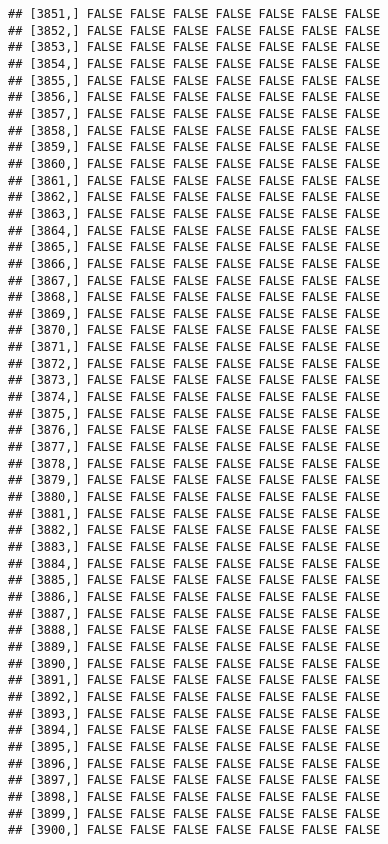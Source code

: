 \documentclass[
]{article}
\begin{document}
\begin{verbatim}
## [3851,] FALSE FALSE FALSE FALSE FALSE FALSE FALSE
## [3852,] FALSE FALSE FALSE FALSE FALSE FALSE FALSE
## [3853,] FALSE FALSE FALSE FALSE FALSE FALSE FALSE
## [3854,] FALSE FALSE FALSE FALSE FALSE FALSE FALSE
## [3855,] FALSE FALSE FALSE FALSE FALSE FALSE FALSE
## [3856,] FALSE FALSE FALSE FALSE FALSE FALSE FALSE
## [3857,] FALSE FALSE FALSE FALSE FALSE FALSE FALSE
## [3858,] FALSE FALSE FALSE FALSE FALSE FALSE FALSE
## [3859,] FALSE FALSE FALSE FALSE FALSE FALSE FALSE
## [3860,] FALSE FALSE FALSE FALSE FALSE FALSE FALSE
## [3861,] FALSE FALSE FALSE FALSE FALSE FALSE FALSE
## [3862,] FALSE FALSE FALSE FALSE FALSE FALSE FALSE
## [3863,] FALSE FALSE FALSE FALSE FALSE FALSE FALSE
## [3864,] FALSE FALSE FALSE FALSE FALSE FALSE FALSE
## [3865,] FALSE FALSE FALSE FALSE FALSE FALSE FALSE
## [3866,] FALSE FALSE FALSE FALSE FALSE FALSE FALSE
## [3867,] FALSE FALSE FALSE FALSE FALSE FALSE FALSE
## [3868,] FALSE FALSE FALSE FALSE FALSE FALSE FALSE
## [3869,] FALSE FALSE FALSE FALSE FALSE FALSE FALSE
## [3870,] FALSE FALSE FALSE FALSE FALSE FALSE FALSE
## [3871,] FALSE FALSE FALSE FALSE FALSE FALSE FALSE
## [3872,] FALSE FALSE FALSE FALSE FALSE FALSE FALSE
## [3873,] FALSE FALSE FALSE FALSE FALSE FALSE FALSE
## [3874,] FALSE FALSE FALSE FALSE FALSE FALSE FALSE
## [3875,] FALSE FALSE FALSE FALSE FALSE FALSE FALSE
## [3876,] FALSE FALSE FALSE FALSE FALSE FALSE FALSE
## [3877,] FALSE FALSE FALSE FALSE FALSE FALSE FALSE
## [3878,] FALSE FALSE FALSE FALSE FALSE FALSE FALSE
## [3879,] FALSE FALSE FALSE FALSE FALSE FALSE FALSE
## [3880,] FALSE FALSE FALSE FALSE FALSE FALSE FALSE
## [3881,] FALSE FALSE FALSE FALSE FALSE FALSE FALSE
## [3882,] FALSE FALSE FALSE FALSE FALSE FALSE FALSE
## [3883,] FALSE FALSE FALSE FALSE FALSE FALSE FALSE
## [3884,] FALSE FALSE FALSE FALSE FALSE FALSE FALSE
## [3885,] FALSE FALSE FALSE FALSE FALSE FALSE FALSE
## [3886,] FALSE FALSE FALSE FALSE FALSE FALSE FALSE
## [3887,] FALSE FALSE FALSE FALSE FALSE FALSE FALSE
## [3888,] FALSE FALSE FALSE FALSE FALSE FALSE FALSE
## [3889,] FALSE FALSE FALSE FALSE FALSE FALSE FALSE
## [3890,] FALSE FALSE FALSE FALSE FALSE FALSE FALSE
## [3891,] FALSE FALSE FALSE FALSE FALSE FALSE FALSE
## [3892,] FALSE FALSE FALSE FALSE FALSE FALSE FALSE
## [3893,] FALSE FALSE FALSE FALSE FALSE FALSE FALSE
## [3894,] FALSE FALSE FALSE FALSE FALSE FALSE FALSE
## [3895,] FALSE FALSE FALSE FALSE FALSE FALSE FALSE
## [3896,] FALSE FALSE FALSE FALSE FALSE FALSE FALSE
## [3897,] FALSE FALSE FALSE FALSE FALSE FALSE FALSE
## [3898,] FALSE FALSE FALSE FALSE FALSE FALSE FALSE
## [3899,] FALSE FALSE FALSE FALSE FALSE FALSE FALSE
## [3900,] FALSE FALSE FALSE FALSE FALSE FALSE FALSE

\end{verbatim}
\end{document}
